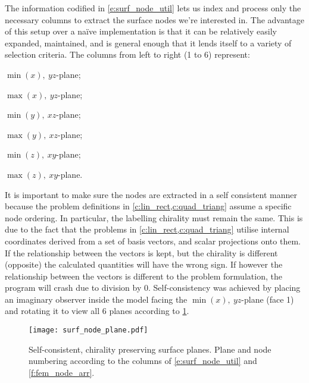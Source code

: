 		The information codified in \cref{e:surf_node_util} lets us index and process only the necessary columns to extract the surface nodes we're interested in. The advantage of this setup over a naïve implementation is that it can be relatively easily expanded, maintained, and is general enough that it lends itself to a variety of selection criteria. The columns from left to right (1 to 6) represent: 
		\begin{inparaenum}
			\item $ \min(x),~ yz $-plane;
			\item $ \max(x),~ yz $-plane;
			\item $ \min(y),~ xz $-plane;
			\item $ \max(y),~ xz $-plane;
			\item $ \min(z),~ xy $-plane;
			\item $ \max(z),~ xy $-plane.
		\end{inparaenum} 
		
		It is important to make sure the nodes are extracted in a self consistent manner because the problem definitions in \cref{c:lin_rect,c:quad_triang} assume a specific node ordering. In particular, the labelling chirality must remain the same. This is due to the fact that the problems in \cref{c:lin_rect,c:quad_triang} utilise internal coordinates derived from a set of basis vectors, and scalar projections onto them. If the relationship between the vectors is kept, but the chirality is different (opposite) the calculated quantities will have the wrong sign. If however the relationship between the vectors is different to the problem formulation, the program will crash due to division by 0. Self-consistency was achieved by placing an imaginary observer inside the  model facing the $ \min(x),~ yz $-plane (face 1) and rotating it to view all 6 planes according to \cref{f:surf_node_plane}.
		\begin{figure}
			\centering
			\texttt{[image: surf\_node\_plane.pdf]}
			\caption[Self-consistent, chirality preserving surface planes.]{Self-consistent, chirality preserving surface planes. Plane and node numbering according to the columns of \cref{e:surf_node_util} and \cref{f:fem_node_arr}.}
			\label{f:surf_node_plane}
		\end{figure}
